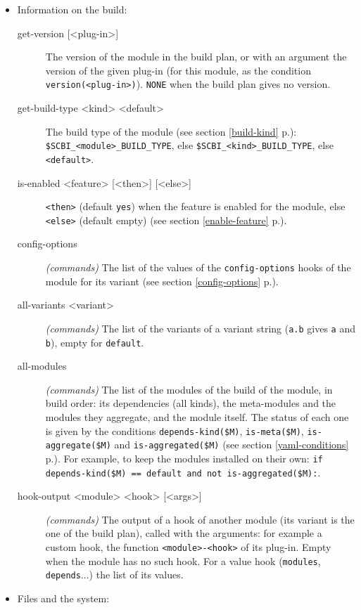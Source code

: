 \documentclass[a4paper,12pt,twoside]{article}
\newcommand{\code}[1]{\texttt{#1}}
\renewcommand{\emph}[1]{\textit{#1}}
\newcommand{\seeref}[1]{see section \ref{#1} p.\pageref{#1}}
\begin{document}
\begin{itemize}
	\item Information on the build:

\begin{description}
	\item[get-version {[<plug-in>]}] The version of the module in the build plan, or with an argument the version of the given plug-in (for this module, as the condition \code{version(<plug-in>)}). \code{NONE} when the build plan gives no version.
	\item[get-build-type <kind> <default>] The build type of the module
	(\seeref{build-kind}): \code{\$SCBI\_<module>\_BUILD\_TYPE}, else
	\code{\$SCBI\_<kind>\_BUILD\_TYPE}, else \code{<default>}.
	\item[is-enabled <feature> {[<then>]} {[<else>]}] \code{<then>}
	(default \code{yes}) when the feature is enabled for the module, else
	\code{<else>} (default empty) (\seeref{enable-feature}).
	\item[config-options] \emph{(commands)} The list of the values of the
	\code{config-options} hooks of the module for its variant
	(\seeref{config-options}).
	\item[all-variants <variant>] \emph{(commands)} The list of the
	variants of a variant string (\code{a.b} gives \code{a} and \code{b}),
	empty for \code{default}.
	\item[all-modules] \emph{(commands)} The list of
	the modules of the build of the module, in build order: its
	dependencies (all kinds), the meta-modules and the modules they
	aggregate, and the module itself. The status of each one is given by
	the conditions \code{depends-kind(\$M)}, \code{is-meta(\$M)},
	\code{is-aggregate(\$M)} and \code{is-aggregated(\$M)}
	(\seeref{yaml-conditions}). For example, to keep the modules installed
	on their own: \code{if depends-kind(\$M) == default and not
	is-aggregated(\$M):}.
	\item[hook-output <module> <hook> {[<args>]}] 
	\emph{(commands)} The output of a hook of another module (its variant
	is the one of the build plan), called with the arguments: for example a
	custom hook, the function \code{<module>-<hook>} of its plug-in. Empty
	when the module has no such hook. For a value hook (\code{modules},
	\code{depends}...) the list of its values.
\end{description}

\item Files and the system:


\end{itemize}
\end{document}
